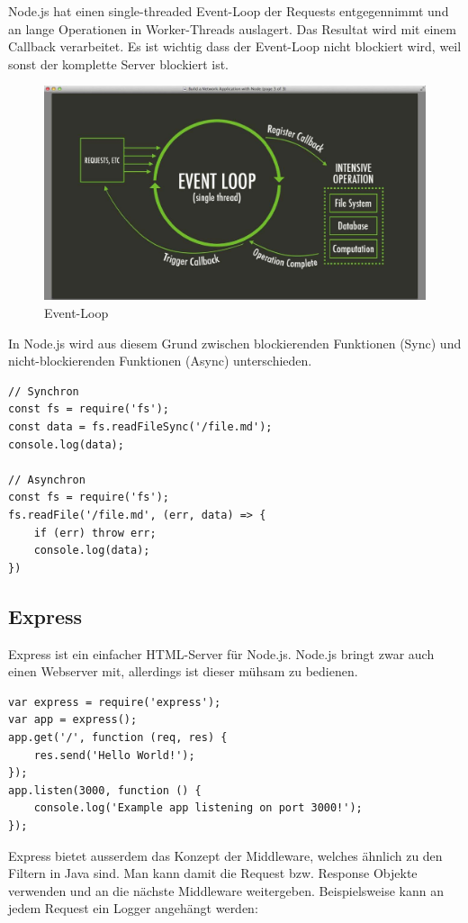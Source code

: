 Node.js hat einen single-threaded Event-Loop der Requests entgegennimmt und an lange Operationen in Worker-Threads auslagert. Das Resultat wird mit einem Callback verarbeitet. Es ist wichtig dass der Event-Loop nicht blockiert wird, weil sonst der komplette Server blockiert ist.

\begin{figure}[h!]
\centering
\includegraphics[width=0.7\linewidth]{fig/node-eventloop}
\caption{Event-Loop}
\label{fig:node-eventloop}
\end{figure}

In Node.js wird aus diesem Grund zwischen blockierenden Funktionen (Sync) und nicht-blockierenden Funktionen (Async) unterschieden.

\begin{lstlisting}[caption=Sychrone vs. asynchrone Funktion]
// Synchron
const fs = require('fs');
const data = fs.readFileSync('/file.md');
console.log(data);

// Asynchron
const fs = require('fs');
fs.readFile('/file.md', (err, data) => {
	if (err) throw err;
	console.log(data);
})
\end{lstlisting}

\subsection{Express}

Express ist ein einfacher HTML-Server für Node.js. Node.js bringt zwar auch einen Webserver mit, allerdings ist dieser mühsam zu bedienen.

\begin{lstlisting}[caption=Einfacher Express Server]
var express = require('express');
var app = express();
app.get('/', function (req, res) {
	res.send('Hello World!');
});
app.listen(3000, function () {
	console.log('Example app listening on port 3000!');
});
\end{lstlisting}

Express bietet ausserdem das Konzept der Middleware, welches ähnlich zu den Filtern in Java sind. Man kann damit die Request bzw. Response Objekte verwenden und an die nächste Middleware weitergeben. Beispielsweise kann an jedem Request ein Logger angehängt werden:


